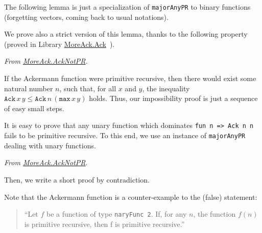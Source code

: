 The following lemma is just a specialization of \texttt{majorAnyPR} to
binary functions (forgetting vectors, coming back to usual notations).



We prove also a strict version of this lemma, thanks to the following property (proved in Library
\href{../theories/html/hydras.MoreAck.Ack.html}{MoreAck.Ack}~).




\vspace{4pt}
\noindent
\emph{From \href{../theories/html/hydras.MoreAck.AckNotPR.html}{MoreAck.AckNotPR}.}






If the Ackermann function were primitive recursive, then there would exist some natural number $n$, such that, for all $x$ and $y$, the inequality 
$\texttt{Ack}\,x\,y\leq \texttt{Ack}\,n\,(\texttt{max}\,x\,y)$ holds.
Thus, our impossibility proof is just a sequence of easy small steps.



\begin{remark}
It is easy to prove that any unary function which dominates \texttt{fun n => Ack n n} fails to be primitive recursive. To this end, we use an instance of \texttt{majorAnyPR} dealing with unary functions.

\vspace{4pt}
\noindent

\emph{From \href{../theories/html/hydras.MoreAck.AckNotPR.html}{MoreAck.AckNotPR}}.



Then, we write  a short proof by contradiction.



\end{remark}

\begin{remark}
Note that the Ackermann function is a counter-example to the (false) statement:
\begin{quote}
{\color{red}
  ``Let $f$ be a function of type \texttt{naryFunc\,2}. If, for any $n$, the function $f(n)$ is primitive recursive, then f is primitive recursive.''}
\end{quote}
\end{remark}

